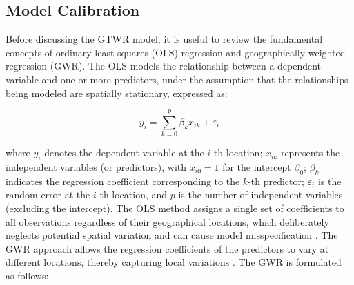 



\subsection{Model Calibration}
\label{subsec:gtwr_calib}
%
%
Before discussing the GTWR model, it is useful to review the fundamental concepts of ordinary least squares (OLS) regression and geographically weighted regression (GWR). The OLS models the relationship between a dependent variable and one or more predictors, under the assumption that the relationships being modeled are spatially stationary, expressed as:

\begin{equation}
	y_i = \sum_{k=0}^{p} \beta_k x_{ik} + \varepsilon_i
	\label{eq:ols}
\end{equation}

\noindent where \(y_i\) denotes the dependent variable at the \(i\)-th location; \(x_{ik}\) represents the independent variables (or predictors), with \(x_{i0} = 1\) for the intercept \(\beta_0\); \(\beta_k\) indicates the regression coefficient corresponding to the \(k\)-th predictor; \(\varepsilon_i\) is the random error at the \(i\)-th location, and \(p\) is the number of independent variables (excluding the intercept).
%
The OLS method assigns a single set of coefficients to all observations regardless of their geographical locations, which deliberately neglects potential spatial variation and can cause model misspecification \citet{mgwr_book_2017}.
%
%
The GWR approach allows the regression coefficients of the predictors to vary at different locations, thereby capturing local variations \citep{brunsdon1996, fotheringham2002geographically}. The GWR is formulated as follows:

